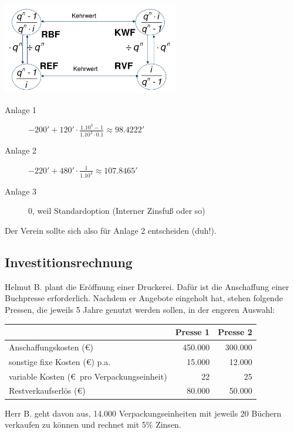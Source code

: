 \documentclass[11pt, a4paper]{article}
\begin{document}
\includegraphics[height=4cm]{RentenUndKapitalfaktoren.png}

\begin{description}
	\item[Anlage 1] $- 200' + 120' \cdot \frac{1.10^3 - 1}{1.10^3 \cdot 0.1} \approx 98.4222'$
	\item[Anlage 2] $- 220' + 480' \cdot \frac{1}{1.10^4} \approx 107.8465'$
	\item[Anlage 3] 0, weil Standardoption (Interner Zinsfuß oder so)
\end{description}
Der Verein sollte sich also für Anlage 2 entscheiden (duh!).

\subsection{Investitionsrechnung}
Helmut B. plant die Eröffnung einer Druckerei. Dafür ist die Anschaffung einer Buchpresse erforderlich. Nachdem er Angebote eingeholt hat, stehen folgende Pressen, die jeweils 5 Jahre genutzt werden sollen, in der engeren Auswahl:

\vspace{\baselineskip}
\begin{tabular}{l|r|r}
	& Presse 1 & Presse 2 \\ \hline
	Anschaffungskosten (\euro) & 450.000 & 300.000 \\
	sonstige fixe Kosten (\euro) p.a. & 15.000 & 12.000 \\
	variable Kosten (\euro \ pro Verpackungseinheit) & 22 & 25 \\
	Restverkaufserlös (\euro) & 80.000 & 50.000
\end{tabular}

\vspace{\baselineskip}
Herr B. geht davon aus, 14.000 Verpackungseinheiten mit jeweils 20 Büchern verkaufen zu können und rechnet mit 5\% Zinsen.
\end{document}
